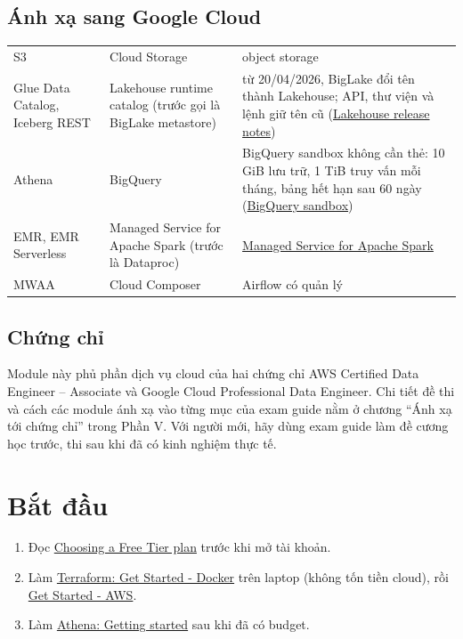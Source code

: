 \subsection{Ánh xạ sang Google Cloud}
\begin{xltabular}{\textwidth}{@{}P{3.6cm} P{4.4cm} L@{}}
\toprule
{} &  &  \\
\midrule
\endhead
\bottomrule
\endfoot
S3 & Cloud Storage & object storage \\
Glue Data Catalog, Iceberg REST & Lakehouse runtime catalog (trước gọi là BigLake metastore) & từ 20/04/2026, BigLake đổi tên thành Lakehouse; API, thư viện và lệnh  giữ tên cũ (\href{https://docs.cloud.google.com/lakehouse/docs/release-notes}{Lakehouse release notes}) \\
Athena & BigQuery & BigQuery sandbox không cần thẻ: 10 GiB lưu trữ, 1 TiB truy vấn mỗi tháng, bảng hết hạn sau 60 ngày (\href{https://cloud.google.com/bigquery/docs/sandbox}{BigQuery sandbox}) \\
EMR, EMR Serverless & Managed Service for Apache Spark (trước là Dataproc) & \href{https://docs.cloud.google.com/managed-spark/docs}{Managed Service for Apache Spark} \\
MWAA & Cloud Composer & Airflow có quản lý \\
\end{xltabular}

\subsection{Chứng chỉ}
Module này phủ phần dịch vụ cloud của hai chứng chỉ AWS Certified Data Engineer -- Associate và Google Cloud Professional Data Engineer. Chi tiết đề thi và cách các module ánh xạ vào từng mục của exam guide nằm ở chương ``Ánh xạ tới chứng chỉ'' trong Phần V. Với người mới, hãy dùng exam guide làm đề cương học trước, thi sau khi đã có kinh nghiệm thực tế.

\section{Bắt đầu}
\begin{enumerate}
  \item Đọc \href{https://docs.aws.amazon.com/awsaccountbilling/latest/aboutv2/free-tier-plans.html}{Choosing a Free Tier plan} trước khi mở tài khoản.
  \item Làm \href{https://developer.hashicorp.com/terraform/tutorials/docker-get-started}{Terraform: Get Started - Docker} trên laptop (không tốn tiền cloud), rồi \href{https://developer.hashicorp.com/terraform/tutorials/aws-get-started}{Get Started - AWS}.
  \item Làm \href{https://docs.aws.amazon.com/athena/latest/ug/getting-started.html}{Athena: Getting started} sau khi đã có budget.
\end{enumerate}

